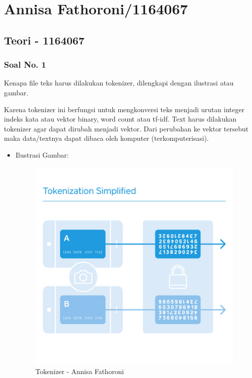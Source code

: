 \section{Annisa Fathoroni/1164067}
\subsection{Teori - 1164067}
\subsubsection{Soal No. 1}
Kenapa file teks harus dilakukan tokenizer, dilengkapi dengan ilustrasi atau gambar.

Karena tokenizer ini berfungsi untuk mengkonversi teks menjadi urutan integer indeks kata atau vektor binary, word count atau tf-idf. Text harus dilakukan tokenizer agar dapat dirubah menjadi vektor. Dari perubahan ke vektor tersebut maka data/textnya dapat dibaca oleh komputer (terkomputerisasi).

\begin{itemize}
\item Ilustrasi Gambar:

\begin{figure}[!hbtp]
\centering
\includegraphics[scale=0.2]{figures/Chapter 7/1164067/Teori/Chapter7AnnisaFathoroni1.jpg}
\caption{Tokenizer - Annisa Fathoroni}
\label{Tokenizer - Annisa Fathoroni}
\end{figure}

\end{itemize}

